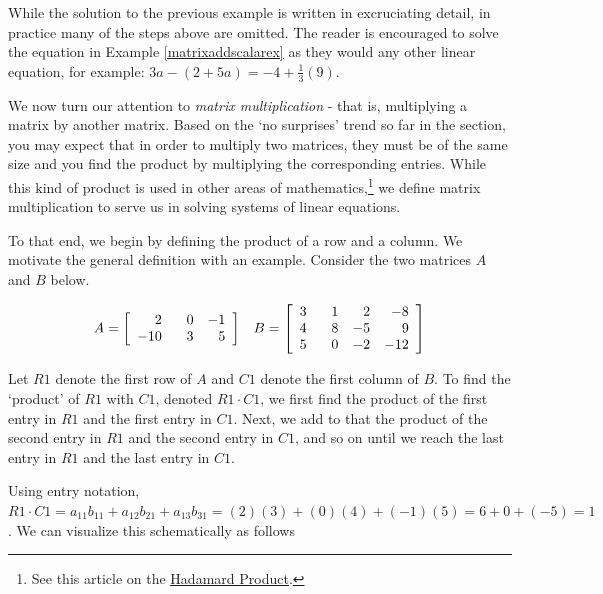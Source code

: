 \documentclass{ximera}
\begin{document}
While the solution to the previous example is written in excruciating detail, in practice many of the steps above are omitted.  The reader is encouraged to solve the equation in Example \ref{matrixaddscalarex} as they would any other linear equation, for example: $3a-(2+5a)=-4+\frac{1}{3}(9)$.

\smallskip

We now turn our attention to \textit{matrix multiplication} - that is, multiplying a matrix by another matrix.  Based on the `no surprises' trend so far in the section, you may expect that in order to multiply two matrices, they must be of the same size and you find the product by multiplying the corresponding entries.  While this kind of product is used in other areas of mathematics,\footnote{See this article on the \href{http://en.wikipedia.org/wiki/Matrix_multiplication}{\underline{Hadamard Product}}.} we define matrix multiplication to serve us in solving systems of linear equations.  

To that end, we begin by defining the product of a row and a column.  We motivate the general definition with an example.  Consider the two matrices $A$ and $B$ below.

\[ \begin{array}{cc}

A = \left[\begin{array}{rrr} 2 & \hphantom{-}0 & -1 \\ -10 & 3 & 5 \\ \end{array} \right]

&

B = \left[\begin{array}{rrrr} 3 & \hphantom{-}1 & 2 & -8 \\ 4 & 8 & -5 & 9  \\ 5 & 0 & -2 & -12 \\  \end{array} \right]

\end{array}\]

Let $R1$ denote the first row of $A$ and $C1$ denote the first column of $B$.  To find the `product' of $R1$ with $C1$, denoted $R1 \cdot C1$, we first find the product of the first entry in $R1$ and the first entry in $C1$.  Next, we add to that the product of the second entry in $R1$ and the second entry in $C1$, and so on until we reach the last entry in $R1$ and the last entry in $C1$.  

Using entry notation, $R1 \cdot C1 = a_{11}b_{11} + a_{12}b_{21}+a_{13}b_{31} = (2)(3) + (0)(4) + (-1)(5) = 6 + 0 + (-5) = 1$.  We can visualize this schematically as follows
\end{document}
